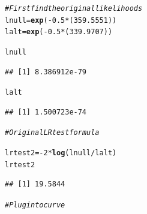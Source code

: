 \documentclass[12pt]{article}\usepackage[]{graphicx}\usepackage[]{color}
\makeatletter
\newcommand{\hlnum}[1]{\textcolor[rgb]{0.686,0.059,0.569}{#1}}%
\newcommand{\hlcom}[1]{\textcolor[rgb]{0.678,0.584,0.686}{\textit{#1}}}%
\newcommand{\hlopt}[1]{\textcolor[rgb]{0,0,0}{#1}}%
\newcommand{\hlstd}[1]{\textcolor[rgb]{0.345,0.345,0.345}{#1}}%
\newcommand{\hlkwb}[1]{\textcolor[rgb]{0.69,0.353,0.396}{#1}}%
\newcommand{\hlkwd}[1]{\textcolor[rgb]{0.737,0.353,0.396}{\textbf{#1}}}%
\newenvironment{kframe}{%
 \def\at@end@of@kframe{}%
 \ifinner\ifhmode%
  \def\at@end@of@kframe{\end{minipage}}%
  \begin{minipage}{\columnwidth}%
 \fi\fi%
 \def\FrameCommand##1{\hskip\@totalleftmargin \hskip-\fboxsep
 \colorbox{shadecolor}{##1}\hskip-\fboxsep
     \hskip-\linewidth \hskip-\@totalleftmargin \hskip\columnwidth}%
 \MakeFramed {\advance\hsize-\width
   \@totalleftmargin\z@ \linewidth\hsize
   \@setminipage}}%
 {\par\unskip\endMakeFramed%
 \at@end@of@kframe}
\newenvironment{knitrout}{}{} %
\makeatother
\begin{document}
\begin{knitrout}
\begin{kframe}
\begin{alltt}
\hlcom{# First find the original likelihoods}
\hlstd{lnull} \hlkwb{=} \hlkwd{exp}\hlstd{(}\hlopt{-}\hlnum{0.5} \hlopt{*} \hlstd{(}\hlnum{359.5551}\hlstd{))}
\hlstd{lalt} \hlkwb{=} \hlkwd{exp}\hlstd{(}\hlopt{-}\hlnum{0.5} \hlopt{*} \hlstd{(}\hlnum{339.9707}\hlstd{))}

\hlstd{lnull}
\end{alltt}
\begin{verbatim}
## [1] 8.386912e-79
\end{verbatim}
\begin{alltt}
\hlstd{lalt}
\end{alltt}
\begin{verbatim}
## [1] 1.500723e-74
\end{verbatim}
\begin{alltt}
\hlcom{# Original LR test formula}

\hlstd{lrtest2} \hlkwb{=} \hlopt{-}\hlnum{2} \hlopt{*} \hlkwd{log}\hlstd{(lnull}\hlopt{/}\hlstd{lalt)}
\hlstd{lrtest2}
\end{alltt}
\begin{verbatim}
## [1] 19.5844
\end{verbatim}
\begin{alltt}
\hlcom{# Plug into curve}


\end{alltt}
\end{kframe}
\end{knitrout}
\end{document}
